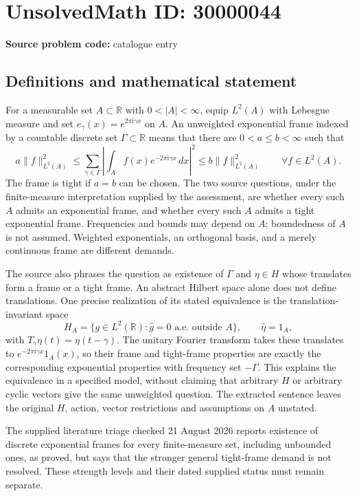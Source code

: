 \documentclass[11pt]{article}
\newcommand{\R}{\mathbb{R}}
\begin{document}
\section*{UnsolvedMath ID: 30000044}
\textbf{Source problem code:} catalogue entry
\subsection{Definitions and mathematical statement}
For a measurable set $A\subset\R$ with $0<|A|<\infty$, equip $L^2(A)$ with Lebesgue measure and set $e_\gamma(x)=e^{2\pi\mathrm i\gamma x}$ on $A$. An unweighted exponential frame indexed by a countable discrete set $\Gamma\subset\R$ means that there are $0<a\leq b<\infty$ such that
\[
 a\|f\|_{L^2(A)}^2\leq
 \sum_{\gamma\in\Gamma}\left|\int_A f(x)e^{-2\pi\mathrm i\gamma x}\,dx\right|^2
 \leq b\|f\|_{L^2(A)}^2
 \qquad\forall f\in L^2(A).
\]
The frame is tight if $a=b$ can be chosen. The two source questions, under the finite-measure interpretation supplied by the assessment, are whether every such $A$ admits an exponential frame, and whether every such $A$ admits a tight exponential frame. Frequencies and bounds may depend on $A$; boundedness of $A$ is not assumed. Weighted exponentials, an orthogonal basis, and a merely continuous frame are different demands.

The source also phrases the question as existence of $\Gamma$ and $\eta\in H$ whose translates form a frame or a tight frame. An abstract Hilbert space alone does not define translations. One precise realization of its stated equivalence is the translation-invariant space
\[
 H_A=\{g\in L^2(\R):\widehat g=0\text{ a.e. outside }A\},
 \qquad \widehat\eta=1_A,
\]
with $T_\gamma\eta(t)=\eta(t-\gamma)$. The unitary Fourier transform takes these translates to $e^{-2\pi\mathrm i\gamma x}1_A(x)$, so their frame and tight-frame properties are exactly the corresponding exponential properties with frequency set $-\Gamma$. This explains the equivalence in a specified model, without claiming that arbitrary $H$ or arbitrary cyclic vectors give the same unweighted question. The extracted sentence leaves the original $H$, action, vector restrictions and assumptions on $A$ unstated.

The supplied literature triage checked 21 August 2026 reports existence of discrete exponential frames for every finite-measure set, including unbounded ones, as proved, but says that the stronger general tight-frame demand is not resolved. These strength levels and their dated supplied status must remain separate.
\end{document}
